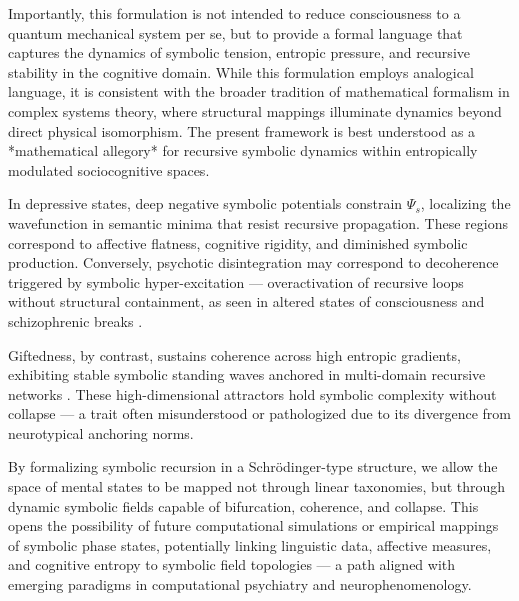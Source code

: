 Importantly, this formulation is not intended to reduce consciousness to a quantum mechanical system per se, but to provide a formal language that captures the dynamics of symbolic tension, entropic pressure, and recursive stability in the cognitive domain. While this formulation employs analogical language, it is consistent with the broader tradition of mathematical formalism in complex systems theory, where structural mappings illuminate dynamics beyond direct physical isomorphism. The present framework is best understood as a *mathematical allegory* for recursive symbolic dynamics within entropically modulated sociocognitive spaces.

In depressive states, deep negative symbolic potentials constrain \( \Psi_s \), localizing the wavefunction in semantic minima that resist recursive propagation. These regions correspond to affective flatness, cognitive rigidity, and diminished symbolic production. Conversely, psychotic disintegration may correspond to decoherence triggered by symbolic hyper-excitation — overactivation of recursive loops without structural containment, as seen in altered states of consciousness and schizophrenic breaks \cite{carhart2014, tagliazucchi2016}.

Giftedness, by contrast, sustains coherence across high entropic gradients, exhibiting stable symbolic standing waves anchored in multi-domain recursive networks \cite{silverman2009, rinn2012}. These high-dimensional attractors hold symbolic complexity without collapse — a trait often misunderstood or pathologized due to its divergence from neurotypical anchoring norms.

By formalizing symbolic recursion in a Schrödinger-type structure, we allow the space of mental states to be mapped not through linear taxonomies, but through dynamic symbolic fields capable of bifurcation, coherence, and collapse. This opens the possibility of future computational simulations or empirical mappings of symbolic phase states, potentially linking linguistic data, affective measures, and cognitive entropy to symbolic field topologies — a path aligned with emerging paradigms in computational psychiatry and neurophenomenology.